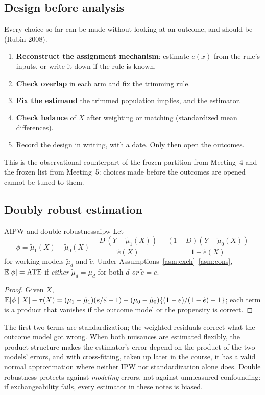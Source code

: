\documentclass[11pt]{article}
\begin{document}
\subsection{Design before analysis}

Every choice so far can be made without looking at an outcome, and should be (Rubin 2008).
\begin{enumerate}
  \item \textbf{Reconstruct the assignment mechanism}: estimate $e(x)$ from the rule's inputs, or write it down if the rule is
  known.
  \item \textbf{Check overlap} in each arm and fix the trimming rule.
  \item \textbf{Fix the estimand} the trimmed population implies, and the estimator.
  \item \textbf{Check balance} of $X$ after weighting or matching (standardized mean differences).
  \item Record the design in writing, with a date. Only then open the outcomes.
\end{enumerate}
This is the observational counterpart of the frozen partition from Meeting~4 and the frozen list from Meeting~5: choices
made before the outcomes are opened cannot be tuned to them.

\subsection{Doubly robust estimation}

\begin{prop}{AIPW and double robustness}{aipw}
Let
\[
  \phi = \tilde\mu_1(X) - \tilde\mu_0(X) + \frac{D\,(Y - \tilde\mu_1(X))}{\tilde e(X)} - \frac{(1-D)(Y - \tilde\mu_0(X))}{1 - \tilde e(X)}
\]
for working models $\tilde\mu_d$ and $\tilde e$. Under Assumptions~\ref{asm:exch}--\ref{asm:cons}, $\mathbb{E}[\phi] = \text{ATE}$ if \emph{either}
$\tilde\mu_d = \mu_d$ for both $d$ \emph{or} $\tilde e = e$.
\end{prop}
\begin{proof}
Given $X$, $\mathbb{E}[\phi \mid X] - \tau(X) = (\mu_1 - \tilde\mu_1)(e/\tilde e - 1) - (\mu_0 - \tilde\mu_0)\{(1-e)/(1-\tilde e) - 1\}$; each term is a
product that vanishes if the outcome model or the propensity is correct.
\end{proof}

The first two terms are standardization; the weighted residuals correct what the outcome model got wrong. When both nuisances
are estimated flexibly, the product structure makes the estimator's error depend on the product of the two models' errors, and
with cross-fitting, taken up later in the course, it has a valid normal approximation where neither IPW nor standardization alone does. Double
robustness protects against \emph{modeling} errors, not against unmeasured confounding: if exchangeability fails, every
estimator in these notes is biased.
\end{document}
